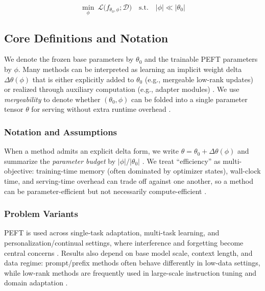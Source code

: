 \documentclass[conference]{IEEEtran}
\begin{document}
\begin{equation}
    \min_{\phi}\ \mathcal{L}\big(f_{\theta_0,\phi}; \mathcal{D}\big)
    \quad \text{s.t.} \quad |\phi| \ll |\theta_0|
\end{equation}

\subsection{Core Definitions and Notation}
We denote the frozen base parameters by $\theta_0$ and the trainable PEFT parameters by $\phi$. Many methods can be interpreted as learning an implicit weight delta $\Delta\theta(\phi)$ that is either explicitly added to $\theta_0$ (e.g., mergeable low-rank updates) or realized through auxiliary computation (e.g., adapter modules) \cite{hu2021lora,houlsby2019parameter}. We use \emph{mergeability} to denote whether $(\theta_0,\phi)$ can be folded into a single parameter tensor $\theta$ for serving without extra runtime overhead \cite{hu2021lora,yadav2023ties}.

\subsubsection{Notation and Assumptions}
When a method admits an explicit delta form, we write $\theta=\theta_0+\Delta\theta(\phi)$ and summarize the \emph{parameter budget} by $|\phi|/|\theta_0|$ \cite{hu2021lora,he2021towards}. We treat ``efficiency'' as multi-objective: training-time memory (often dominated by optimizer states), wall-clock time, and serving-time overhead can trade off against one another, so a method can be parameter-efficient but not necessarily compute-efficient \cite{dettmers2023qlora,han2024parameter,chen2023parameter}.

\subsubsection{Problem Variants}
PEFT is used across single-task adaptation, multi-task learning, and personalization/continual settings, where interference and forgetting become central concerns \cite{coleman2025parameter,zhang2023composing}. Results also depend on base model scale, context length, and data regime: prompt/prefix methods often behave differently in low-data settings, while low-rank methods are frequently used in large-scale instruction tuning and domain adaptation \cite{li2021prefix,liu2021p,hu2021lora,dettmers2023qlora}.
\end{document}

